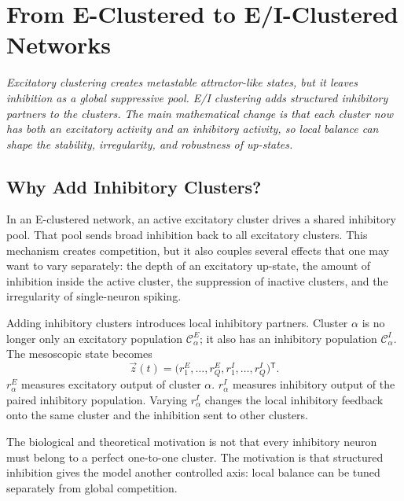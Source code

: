 \chapter{From E-Clustered to E/I-Clustered Networks}
\label{ch:e-to-ei-clustered-networks}

\textit{Excitatory clustering creates metastable attractor-like states, but it leaves inhibition as a global suppressive pool. E/I clustering adds structured inhibitory partners to the clusters. The main mathematical change is that each cluster now has both an excitatory activity and an inhibitory activity, so local balance can shape the stability, irregularity, and robustness of up-states.}

\section{Why Add Inhibitory Clusters?}
\label{sec:why-add-inhibitory-clusters}

In an E-clustered network, an active excitatory cluster drives a shared inhibitory pool. That pool sends broad inhibition back to all excitatory clusters. This mechanism creates competition, but it also couples several effects that one may want to vary separately: the depth of an excitatory up-state, the amount of inhibition inside the active cluster, the suppression of inactive clusters, and the irregularity of single-neuron spiking.

Adding inhibitory clusters introduces local inhibitory partners. Cluster $\alpha$ is no longer only an excitatory population $\mathcal{C}_{\alpha}^{E}$; it also has an inhibitory population $\mathcal{C}_{\alpha}^{I}$. The mesoscopic state becomes
%
\begin{equation}
  \vec z(t)
  =
  \bigl(
    r_1^E,\ldots,r_Q^E,
    r_1^I,\ldots,r_Q^I
  \bigr){}^{\mathsf T}.
  \label{eq:ei-state-vector}
\end{equation}
%
$r_{\alpha}^{E}$ measures excitatory output of cluster $\alpha$. $r_{\alpha}^{I}$ measures inhibitory output of the paired inhibitory population. Varying $r_{\alpha}^{I}$ changes the local inhibitory feedback onto the same cluster and the inhibition sent to other clusters.

The biological and theoretical motivation is not that every inhibitory neuron must belong to a perfect one-to-one cluster. The motivation is that structured inhibition gives the model another controlled axis: local balance can be tuned separately from global competition.

